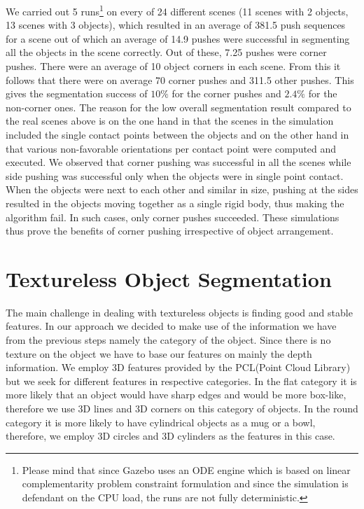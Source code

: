 We carried out 5 runs\footnote{Please mind that since Gazebo uses an ODE engine 
which is based on linear complementarity problem constraint formulation and since the
simulation is defendant on the CPU load, the runs are not fully deterministic.} 
on every of 24 different  scenes (11 scenes  with 2
objects, 13  scenes with  3 objects), which resulted in an average  of 381.5
push sequences for a scene out of which an average of 14.9 pushes were
successful in segmenting  all the objects in the  scene correctly. Out
of these, 7.25  pushes were corner pushes. There were an average  of 10
object corners in each scene. From this it follows that there were on average
70 corner pushes and 311.5 other pushes. This gives the segmentation success of $10\%$
for the corner pushes and $2.4\%$ for the non-corner ones. The reason for the low
overall segmentation result compared to the real scenes above is on the one hand in that the scenes in the simulation
included the single contact points between the objects and on the other hand in 
that various non-favorable orientations per contact point were computed and executed.
We observed  that corner pushing was successful  in all  the scenes while  side pushing  was successful
only  when  the  objects were in single point contact. 
When the  objects were next to each other  and similar in size,
pushing  at the sides  resulted in  the objects  moving together  as a
single rigid body, thus making the algorithm fail. In such cases, only
corner  pushes succeeded.  These simulations  thus prove the benefits of
corner pushing irrespective of object arrangement.



\section{Textureless Object Segmentation}
\label{sec:textureless}

The main challenge in dealing with textureless objects is finding good and stable features. In our approach we decided to make use of the information we have from the previous steps namely the category of the object. Since there is no texture on the object we have to base our features on mainly the depth information. We employ 3D features provided by the PCL(Point Cloud Library) but we seek for different features in respective categories. In the flat category it is more likely that an object would have sharp edges and would be more box-like, therefore we use 3D lines and 3D corners on this category of objects. In the round category it is more likely to have cylindrical objects as a mug or a bowl, therefore, we employ 3D circles and 3D cylinders as the features in this case.

